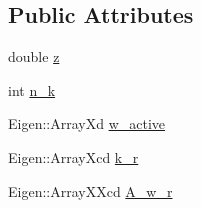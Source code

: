\subsection*{Public Attributes}
\begin{DoxyCompactItemize}
\item 
double \hyperlink{classpropagation_aeacfc091fafd1fdb1af4536f6f587e55}{z}
\item 
int \hyperlink{classpropagation_a93033ee98c04a6fe007eae5c856e76b3}{n\+\_\+k}
\item 
Eigen\+::\+Array\+Xd \hyperlink{classpropagation_a4c24f42d4148eded469c6479d6bf1661}{w\+\_\+active}
\item 
Eigen\+::\+Array\+Xcd \hyperlink{classpropagation_a9e437271e452fa1732f50e006347b501}{k\+\_\+r}
\item 
Eigen\+::\+Array\+X\+Xcd \hyperlink{classpropagation_ad3a84addde67e43bbb606408193f78ee}{A\+\_\+w\+\_\+r}
\end{DoxyCompactItemize}

